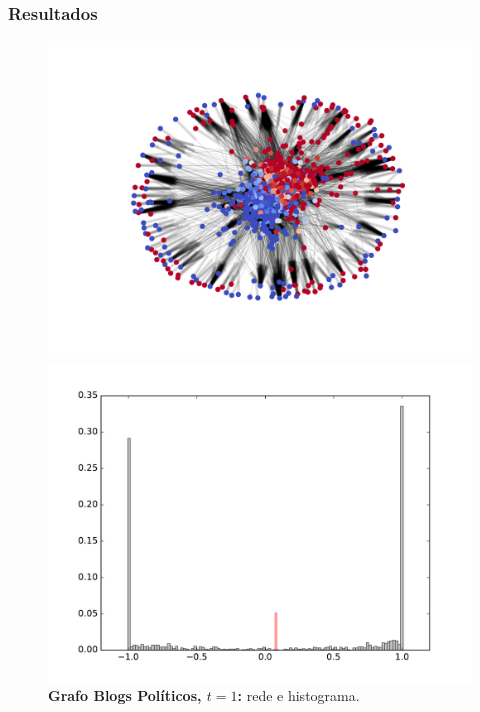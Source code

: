 \begin{frame}
  \frametitle{Resultados}

  \begin{figure}
  \centering
  \begin{minipage}{5.5cm}
    \includegraphics[width=\textwidth]{./figures/99N001}
  \end{minipage}
  \begin{minipage}{5.5cm}
    \includegraphics[width=\textwidth]{./figures/99H001}
  \end{minipage}
  \vspace{5mm}
  \caption*{\textbf{Grafo Blogs Políticos, $t = 1$:} rede e histograma.}
  \end{figure}
\end{frame}

